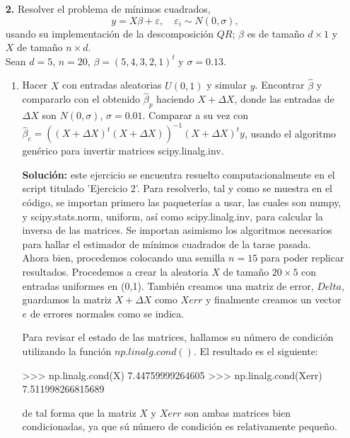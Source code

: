 \documentclass[letterpaper]{article}
\newcommand{\1}{\mathds{1}}
\theoremstyle{definition}
\theoremstyle{definition}
\theoremstyle{definition}
\theoremstyle{definition}
\theoremstyle{definition}
\begin{document}
\begin{enumerate}
    \item [\textbf{2.}] Resolver el problema de mínimos cuadrados,
        \[
        y=X\beta+\varepsilon, \quad \varepsilon_i\sim N(0,\sigma),
        \]
        usando su implementación de la descomposición $QR$; $\beta$ es de tamaño $d\times 1$ y $X$ de tamaño
        $n\times d$. \\
        Sean $d=5$, $n=20$, $\beta=(5,4,3,2,1)^t$ y $\sigma=0.13$.
        \begin{enumerate}
            \item Hacer $X$ con entradas aleatorias $U(0,1)$ y simular $y$. Encontrar $\hat{\beta}$ y 
            compararlo con el obtenido $\hat{\beta}_p$ haciendo $X+\Delta X$, donde las entradas de
            $\Delta X$ son $N(0,\sigma)$,  $\sigma=0.01$. Comparar a su vez con $\hat{\beta}_c=\left(\left(X+\Delta X\right)^t\left(X+\Delta X\right)\right)^{-1}(X+\Delta X)^ty$,
            usando el algoritmo genérico para invertir matrices scipy.linalg.inv.
            \newline

            \textbf{Solución:} este ejercicio se encuentra resuelto computacionalmente en el script titulado 'Ejercicio 2'. Para resolverlo,
            tal y como se muestra en el código, se importan primero las paqueterías a usar, las cuales
            son numpy, y scipy.stats.norm, uniform, así como scipy.linalg.inv, para calcular la inversa
            de las matrices. Se importan asimismo los algoritmos necesarios para hallar el estimador
            de mínimos cuadrados de la tarae pasada.\\

            Ahora bien, procedemos colocando una semilla $n=15$ para poder replicar resultados. Procedemos a crear la aleatoria $X$ de tamaño $20\times5$ 
            con entradas uniformes en (0,1). También creamos una matriz de error, $Delta$, guardamos la matriz $X+\Delta X$ como $Xerr$ y finalmente
            creamos un vector $e$ de errores normales como se indica. 
            \newline

            Para revisar el estado de las matrices, hallamos su número de condición utilizando
            la función $np.linalg.cond()$. El resultado es el siguiente:
            \begin{verbatim*}
                >>> np.linalg.cond(X)
7.44759999264605
>>> np.linalg.cond(Xerr)
7.511998266815689
            \end{verbatim*}
            de tal forma que la matriz $X$ y $Xerr$ son ambas matrices bien condicionadas, ya que
            sú número de condición es relativamente pequeño.\\


\end{enumerate}
\end{enumerate}
\end{document}
